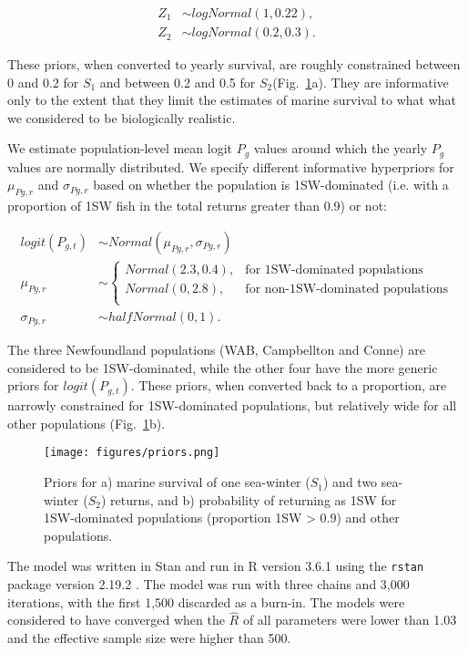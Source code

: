 \documentclass[12pt]{article}
\newcommand{\So}{$S_{1}$\xspace}
\newcommand{\St}{$S_{2}$\xspace}
\newcommand{\Pg}{$P_g$\xspace}
\newcommand{\prmu}{$\mu_{Pg,r}$\xspace}
\newcommand{\prsig}{$\sigma_{Pg,r}$\xspace}
\begin{document}
\begin{align}
Z_1 &\sim logNormal(1, 0.22),   \\ 
Z_2 &\sim logNormal(0.2, 0.3).
\end{align}

These priors, when converted to yearly survival, are roughly constrained between
0 and 0.2 for \So and between 0.2 and 0.5 for \St (Fig.~\ref{fig:priors}a). They are
informative only to the extent that they limit the estimates of marine survival
to what what we considered to be biologically realistic.

We estimate population-level mean logit \Pg values around which the yearly \Pg
values are normally distributed. We specify different informative hyperpriors
for \prmu and \prsig based on whether the population is 1SW-dominated (i.e.
with a proportion of 1SW fish in the total returns greater than 0.9) or not:

\begin{align}
    logit(P_{g,t}) &\sim Normal(\mu_{Pg,r}, \sigma_{Pg,r}) \\
    \mu_{Pg,r} &\sim 
    \begin{cases}
       Normal(2.3, 0.4),  &\text{for 1SW-dominated populations} \\
       Normal(0, 2.8), &\text{for non-1SW-dominated populations} \\
   \end{cases} \\
    \sigma_{Pg,r} &\sim halfNormal(0, 1).
\end{align}

The three Newfoundland populations (WAB, Campbellton and Conne) are considered to be 
1SW-dominated, while the other four have the more generic priors for $logit(P_{g,t})$.
These priors, when converted back to a proportion, are narrowly constrained
for 1SW-dominated populations, but relatively wide for all other populations
(Fig.~\ref{fig:priors}b).

\begin{figure}[htbp] \centering
    \texttt{[image: figures/priors.png]} \caption{Priors
        for a) marine survival of one sea-winter (\So) and two sea-winter
        (\St) returns, and b) probability of returning as 1SW for
        1SW-dominated populations (proportion 1SW > 0.9) and other populations.}
    \label{fig:priors} 
\end{figure}


The model was written in Stan \citep{Carpenter2017} and run in R version 3.6.1
\citep{RCoreTeam2019} using the \texttt{rstan} package version 2.19.2
\citep{StanDevelopmentTeam2019}.
The model was run with three chains and 3,000 iterations, with the first 1,500
discarded as a burn-in. The models were considered to have converged when the
$\hat R$ of all parameters were lower than 1.03 and the effective sample size 
were higher than 500.
\end{document}
